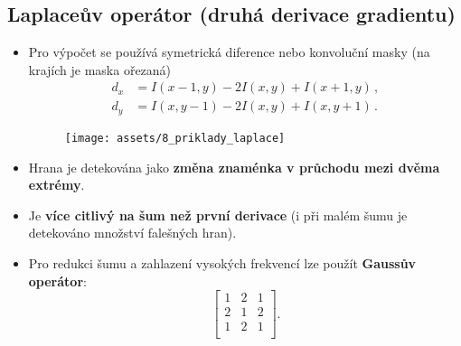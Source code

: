 \subsection*{Laplaceův operátor (druhá derivace gradientu)}
\begin{itemize}
    \item Pro výpočet se používá symetrická diference nebo konvoluční masky (na krajích je maska ořezaná)
          \begin{equation*}
              \begin{split}
                  d_x &= I(x - 1, y) - 2I(x, y) + I(x + 1, y) \, ,\\
                  d_y&= I(x, y - 1) - 2I(x, y) + I(x, y + 1) \, .
              \end{split}
          \end{equation*}
          \begin{figure}[H]
              \begin{center}
                  \texttt{[image: assets/8\_priklady\_laplace]}
              \end{center}
          \end{figure}
    \item Hrana je detekována jako \textbf{změna znaménka v průchodu mezi dvěma extrémy}.
    \item Je \textbf{více citlivý na šum než první derivace} (i při malém šumu je detekováno množství falešných hran).
    \item Pro redukci šumu a zahlazení vysokých frekvencí lze použít \textbf{Gaussův operátor}:
          \begin{equation*}
              \begin{bmatrix}
                  1 & 2 & 1 \\[0.3em]
                  2 & 1 & 2 \\[0.3em]
                  1 & 2 & 1 \\
              \end{bmatrix}.
          \end{equation*}
\end{itemize}
